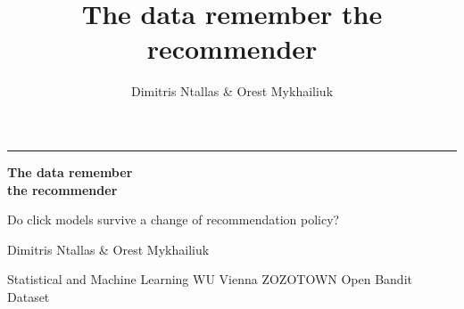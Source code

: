 \documentclass[aspectratio=169,10pt]{beamer}
\title{The data remember the recommender}
\author{Dimitris Ntallas \& Orest Mykhailiuk}
\begin{document}
{
\begin{frame}[plain]
\vspace{.6cm}
{\color{teal}\rule{1.6cm}{3pt}}\par\vspace{.5cm}
{\fontsize{30}{34}\selectfont\color{white}\bfseries The data remember\\[.12cm] the recommender}\par\vspace{.45cm}
{\Large\color{white!80} Do click models survive a change of recommendation policy?}\par
\vfill
{\color{white}Dimitris Ntallas \& Orest Mykhailiuk}\par\vspace{.06cm}
{\small\color{white!65} Statistical and Machine Learning \textperiodcentered{} WU Vienna \textperiodcentered{} ZOZOTOWN Open Bandit Dataset}\par\vspace{.5cm}
\end{frame}}
\end{document}
